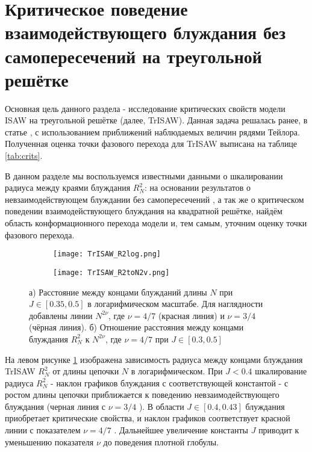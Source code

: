 \section{Критическое поведение взаимодействующего блуждания без самопересечений на треугольной решётке}
\label{sec:TrISAW_crit}

Основная цель данного раздела - исследование критических свойств модели ISAW на треугольной решётке (далее, TrISAW).
Данная задача решалась ранее, в статье \cite{Privman1986}, с использованием приближений наблюдаемых величин рядями Тейлора.
Полученная оценка точки фазового перехода для TrISAW выписана на таблице \ref{tab:crits}.

В данном разделе мы воспользуемся известными данными о шкалировании радиуса между краями блуждания $R^2_N$:
на основании результатов о невзаимодействующем блуждании без самопересечений \cite{Rensburg2015}, а так же о критическом поведении взаимодействующего блуждания \cite{Duplantier1987} на квадратной решётке,
найдём область конформационного перехода модели и, тем самым, уточним оценку точки фазового перехода.
 

\begin{figure}[h]
\begin{subfigure}{0.49\textwidth}
\texttt{[image: TrISAW\_R2log.png]}
\caption{}
\label{fig:TrISAW_R2log}
\end{subfigure}
\hfill
\begin{subfigure}{0.49\textwidth}
\texttt{[image: TrISAW\_R2toN2v.png]}
\caption{}
\label{fig:TrISAW_R2toN2v}
\end{subfigure}
\caption{а) Расстояние между концами блужданий длины $N$ при $J \in [0.35,0.5]$ в логарифмическом масштабе. 
Для наглядности добавлены линии $N^{2\nu}$, где $\nu = 4/7$ (красная линия) и $\nu=3/4$ (чёрная линия).
б) Отношение расстояния между концами блуждания $R^2_N$ к $N^{2\nu}$, где $\nu=4/7$ при $J \in [0.3,0.5]$}
\end{figure}

На левом рисунке \ref{fig:TrISAW_R2log} изображена зависимость радиуса между концами блуждания TrISAW $R^2_N$ от длины цепочки $N$ в логарифмическом.
При $J < 0.4$ шкалирование радиуса $R^2_N$ - наклон графиков блуждания с соответствующей константой - с ростом длины цепочки приближается к поведению невзаимодействующего блуждания (черная линия с $\nu = 3/4$ \cite{Rensburg2015}).
В области $J \in [0.4, 0.43]$ блуждания приобретает критические свойства, и наклон графиков соответствует красной линии с показателем $\nu=4/7$ \cite{Duplantier1987}.
Дальнейшее увеличение константы $J$ приводит к уменьшению показателя $\nu$ до поведения плотной глобулы.

